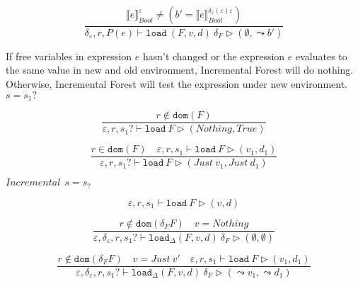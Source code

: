 \documentclass[10pt,twoside,a4paper]{article}
\theoremstyle{theorem}
\theoremstyle{lemma}
\theoremstyle{property}
\theoremstyle{definition}
\theoremstyle{assumption}
\begin{document}
\begin{displaymath}
	\frac{ \llbracket e \rrbracket^{\varepsilon}_{Bool} \not= (b' = \llbracket e \rrbracket^{\delta_\varepsilon(\varepsilon) \varepsilon}_{Bool})}
	{\delta_\varepsilon, r, P(e) \vdash \mathtt{load}~ (F,v,d) ~\delta_F \rhd (\emptyset,\leadsto b')}
\end{displaymath}

If free variables in expression $e$ hasn't changed or the expression $e$ evaluates to the same value in new and old environment, Incremental Forest will do nothing.
Otherwise, Incremental Forest will test the expression under new environment.\\

$\boxed{s = s_1?}$

\begin{displaymath}
	\frac
	{r \notin \mathtt{dom}(F)}
	{\varepsilon, r, s_1? \vdash \mathtt{load}~F \rhd (Nothing, True)}
\end{displaymath}

\begin{displaymath}
	\frac
	{r \in \mathtt{dom}(F) \quad \varepsilon, r, s_1 \vdash \mathtt{load}~F \rhd (v_1, d_1)}
	{\varepsilon, r, s_1? \vdash \mathtt{load}~F \rhd (Just ~v_1, Just ~d_1)}
\end{displaymath}


$\boxed{Incremental~~s = s_?}$

\begin{displaymath}
	\varepsilon, r, s_1 \vdash \mathtt{load}~F \rhd (v, d)
\end{displaymath}

\begin{displaymath}
	\frac{
		r \notin \mathtt{dom}(\delta_F F) \quad v = Nothing
	}
	{\varepsilon, \delta_\varepsilon, r, s_1? \vdash \mathtt{load}_\Delta (F,v,d)~ \delta_F \rhd (\emptyset, \emptyset)}
\end{displaymath}
\begin{comment}
\begin{displaymath}
	\frac{
		r' = \varepsilon_{new}(r) \quad r \notin \mathtt{dom}(F) \quad r' \notin \mathtt{dom}(\delta_F~F)
	}
	{\delta_\varepsilon, s? \vdash \mathtt{load}_\Delta (F,v,d)~ u \rhd (\emptyset, \emptyset)}
\end{displaymath}
\end{comment}

\begin{displaymath}
	\frac{
		r \notin \mathtt{dom}(\delta_F F) \quad v = Just~ v' \quad
		\varepsilon, r, s_1 \vdash \mathtt{load}~F \rhd (v_1, d_1)
	}
	{\varepsilon, \delta_\varepsilon, r, s_1? \vdash \mathtt{load}_\Delta (F,v,d)~ \delta_F \rhd (\leadsto v_1, \leadsto d_1)}
\end{displaymath}
\end{document}

